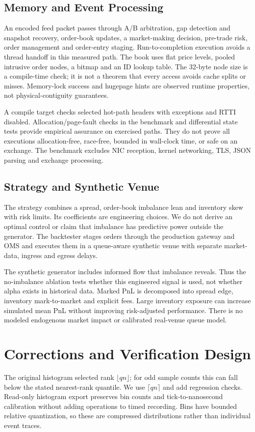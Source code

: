 \documentclass[conference]{IEEEtran}
\begin{document}
\subsection{Memory and Event Processing}
An encoded feed packet passes through A/B arbitration, gap detection and snapshot recovery, order-book updates, a market-making decision, pre-trade risk, order management and order-entry staging. Run-to-completion execution avoids a thread handoff in this measured path. The book uses flat price levels, pooled intrusive order nodes, a bitmap and an ID lookup table. The 32-byte node size is a compile-time check; it is not a theorem that every access avoids cache splits or misses. Memory-lock success and hugepage hints are observed runtime properties, not physical-contiguity guarantees.

A compile target checks selected hot-path headers with exceptions and RTTI disabled. Allocation/page-fault checks in the benchmark and differential state tests provide empirical assurance on exercised paths. They do not prove all executions allocation-free, race-free, bounded in wall-clock time, or safe on an exchange. The benchmark excludes NIC reception, kernel networking, TLS, JSON parsing and exchange processing.

\subsection{Strategy and Synthetic Venue}
The strategy combines a spread, order-book imbalance lean and inventory skew with risk limits. Its coefficients are engineering choices. We do not derive an optimal control or claim that imbalance has predictive power outside the generator. The backtester stages orders through the production gateway and OMS and executes them in a queue-aware synthetic venue with separate market-data, ingress and egress delays.

The synthetic generator includes informed flow that imbalance reveals. Thus the no-imbalance ablation tests whether this engineered signal is used, not whether alpha exists in historical data. Marked PnL is decomposed into spread edge, inventory mark-to-market and explicit fees. Large inventory exposure can increase simulated mean PnL without improving risk-adjusted performance. There is no modeled endogenous market impact or calibrated real-venue queue model.

\section{Corrections and Verification Design}
The original histogram selected rank $\lfloor qn\rfloor$; for odd sample counts this can fall below the stated nearest-rank quantile. We use $\lceil qn\rceil$ and add regression checks. Read-only histogram export preserves bin counts and tick-to-nanosecond calibration without adding operations to timed recording. Bins have bounded relative quantization, so these are compressed distributions rather than individual event traces.
\end{document}

